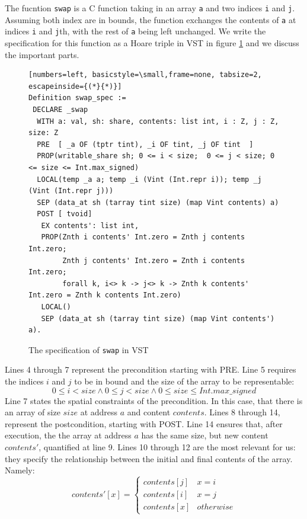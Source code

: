 \documentclass[onecolumn, preprint]{sigplanconf}
\begin{document}
The fucntion \lstinline|swap| is a C function taking in an array \lstinline|a| and two indices \lstinline|i| and \lstinline|j|. Assuming both index are in bounds, the function exchanges the contents of \lstinline|a| at indices \lstinline|i| and \lstinline|j|th, with the rest of \lstinline|a| being left unchanged. We write the specification for this function as a Hoare triple in VST in figure \ref{fig:hoarswap} and we discuss the important parts.
\begin{figure}
\begin{lstlisting}[numbers=left, basicstyle=\small,frame=none, tabsize=2, escapeinside={(*}{*)}]  
Definition swap_spec :=
 DECLARE _swap
  WITH a: val, sh: share, contents: list int, i : Z, j : Z, size: Z
  PRE  [ _a OF (tptr tint), _i OF tint, _j OF tint  ]
  PROP(writable_share sh; 0 <= i < size;  0 <= j < size; 0 <= size <= Int.max_signed)
  LOCAL(temp _a a; temp _i (Vint (Int.repr i)); temp _j (Vint (Int.repr j)))
  SEP (data_at sh (tarray tint size) (map Vint contents) a)
  POST [ tvoid]
   EX contents': list int,
   PROP(Znth i contents' Int.zero = Znth j contents Int.zero;
        Znth j contents' Int.zero = Znth i contents Int.zero;
        forall k, i<> k -> j<> k -> Znth k contents' Int.zero = Znth k contents Int.zero)
   LOCAL()
   SEP (data_at sh (tarray tint size) (map Vint contents') a).
\end{lstlisting}
\label{fig:hoarswap}
   \caption{The specification of \lstinline|swap| in VST}
\end{figure}
Lines 4 through 7 represent the precondition starting with PRE. Line 5 requires the indices $i$ and $j$ to be in bound and the size of the array to be representable:
$$ 0 \leq i < size \wedge 0 \leq j < size  \wedge 0 \leq size \leq Int.max\_signed $$
Line 7 states the spatial constraints of the precondition. In this case, that there is an array of size $size$ at address $a$ and content $contents$. Lines 8 through 14, represent the postcondition, starting with POST. Line 14 ensures that, after execution, the the array at address $a$ has the same size, but new content $contents'$, quantified at line 9. Lines 10 through 12 are the most relevant for us: they specify the relationship between the initial and final contents of the array. Namely:
$$contents'[x] = \left\{\begin{array}{cc}contents[j] & x = i \\contents[i] & x = j \\contents[x] & otherwise\end{array}\right.$$
\end{document}
